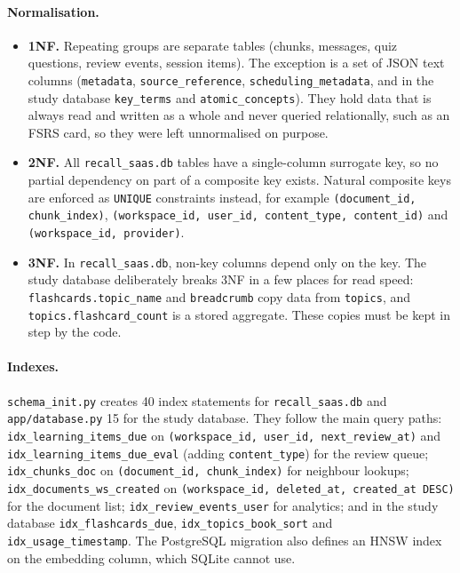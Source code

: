 \paragraph{Normalisation.}
\begin{itemize}[leftmargin=*]
  \item \textbf{1NF.} Repeating groups are separate tables (chunks, messages, quiz
    questions, review events, session items). The exception is a set of JSON text
    columns (\texttt{metadata}, \texttt{source\_reference},
    \texttt{scheduling\_metadata}, and in the study database \texttt{key\_terms} and
    \texttt{atomic\_concepts}). They hold data that is always read and written as a whole
    and never queried relationally, such as an FSRS card, so they were left unnormalised
    on purpose.
  \item \textbf{2NF.} All \texttt{recall\_saas.db} tables have a single-column surrogate
    key, so no partial dependency on part of a composite key exists. Natural composite
    keys are enforced as \texttt{UNIQUE} constraints instead, for example
    \texttt{(document\_id, chunk\_index)},
    \texttt{(workspace\_id, user\_id, content\_type, content\_id)} and
    \texttt{(workspace\_id, provider)}.
  \item \textbf{3NF.} In \texttt{recall\_saas.db}, non-key columns depend only on the
    key. The study database deliberately breaks 3NF in a few places for read speed:
    \texttt{flashcards.topic\_name} and \texttt{breadcrumb} copy data from
    \texttt{topics}, and \texttt{topics.flashcard\_count} is a stored aggregate. These
    copies must be kept in step by the code.
\end{itemize}

\paragraph{Indexes.}
\texttt{schema\_init.py} creates 40 index statements for \texttt{recall\_saas.db} and
\texttt{app/database.py} 15 for the study database. They follow the main query paths:
\texttt{idx\_learning\_items\_due} on \texttt{(workspace\_id, user\_id, next\_review\_at)}
and \texttt{idx\_learning\_items\_due\_eval} (adding \texttt{content\_type}) for the
review queue; \texttt{idx\_chunks\_doc} on \texttt{(document\_id, chunk\_index)} for
neighbour lookups; \texttt{idx\_documents\_ws\_created} on
\texttt{(workspace\_id, deleted\_at, created\_at DESC)} for the document list;
\texttt{idx\_review\_events\_user} for analytics; and in the study database
\texttt{idx\_flashcards\_due}, \texttt{idx\_topics\_book\_sort} and
\texttt{idx\_usage\_timestamp}. The PostgreSQL migration also defines an HNSW index on
the embedding column, which SQLite cannot use.

